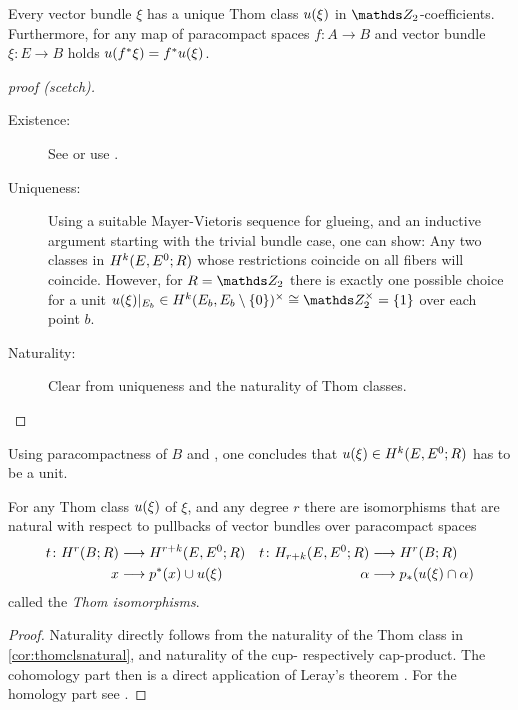 \begin{Cor}
  Every vector bundle $\xi$ has a unique Thom class ${u}(\xi)$ in
  $\Zmod2$-coefficients.
  Furthermore, for any map of paracompact spaces $f\colon A\to B$ and
  vector bundle $\xi\colon E\to B$ holds ${u}({f}^* \xi) = {f}^* {u}(\xi)$.
  \begin{proof}[proof (scetch)]
    \begin{description}
    \item[Existence:] See \cite[Theorem~4D.10]{hatcher} or use
      \cite[Proposition~17.9.3]{tomdieck}.
    \item[Uniqueness:] %
      Using a suitable Mayer-Vietoris sequence for glueing, and an
      inductive argument starting with the trivial bundle case, one can show:
      Any two classes in $H^{k}(E, {E}^0;R)$ whose
      restrictions coincide on all fibers will coincide.
      However, for $R=\Zmod2$ there is exactly one possible choice for
      a unit $\u{\xi}|_{E_b}\in
      \H^{\rkk}(\spherepair{E_b})^\times\cong\Zmod2^\times=\{1\}$
      over each point $b$.
    \item[Naturality:] Clear from uniqueness and the naturality of Thom classes.
    \end{description}
  \end{proof}
\end{Cor}

\begin{Rem}
  Using paracompactness of $B$ and
  \cite[Proposition~17.9.6]{tomdieck}, one concludes that
  ${u}(\xi)\in H^{k}(E, {E}^0;R)$ has to be a unit.
\end{Rem}

\begin{Thm}
  For any Thom class ${u}(\xi)$ of $\xi$, and any degree $r$ there are
  isomorphisms that are natural with respect to pullbacks of vector
  bundles over paracompact spaces
  \begin{align*}
    t\colon
    H^r(B;R) &\longrightarrow H^{r+k}(E, {E}^0; R)
    & t\colon
      H_{r+k}(E, {E}^0; R) &\longrightarrow H^r(B;R)
    \\
    x &\longrightarrow {p}^* (x) \cup {u}(\xi)
    & \alpha &\longrightarrow {p}_* ({u}(\xi) \cap \alpha)
  \end{align*}
  called the \emph{Thom isomorphisms}.
  \begin{proof}
    Naturality directly follows from the naturality of the Thom class
    in \autoref{cor:thomclsnatural}, and naturality of the cup-
    respectively cap-product.
    The cohomology part then is a direct application of Leray's theorem
    \cite[Theorem~4D.8]{hatcher}.
    For the homology part see \forexample \cite[Theorem~14.6]{switzer}.
  \end{proof}
\end{Thm}

